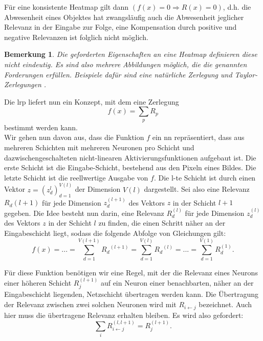 \documentclass[twoside, 12pt,a4paper]{book}
\newtheorem{remark}[theorem]{Bemerkung}
\numberwithin{equation}{section}
\begin{document}
	\noindent Für eine konsistente Heatmap gilt dann $(f(x) = 0 \Rightarrow R(x) = 0)$, d.h. die Abwesenheit eines Objektes hat zwangsläufig auch die Abwesenheit jeglicher Relevanz in der Eingabe zur Folge, eine Kompensation durch positive und negative Relevanzen ist folglich nicht möglich.
	
	\begin{remark}
		Die geforderten Eigenschaften an eine Heatmap definieren diese nicht eindeutig. Es sind also mehrere Abbildungen möglich, die die genannten Forderungen erfüllen. Beispiele dafür sind eine natürliche Zerlegung und Taylor-Zerlegungen \cite{dtd_paper}.
	\end{remark}
	
	\noindent Die \ac{lrp} liefert nun ein Konzept, mit dem eine Zerlegung 
	\begin{equation}
	f(x) = \sum_pR_p
	\end{equation}
	bestimmt werden kann.\\
	
	
	
	\noindent Wir gehen nun davon aus, dass die Funktion $f$ ein \ac{nn} repräsentiert, dass aus mehreren Schichten mit mehreren Neuronen pro Schicht und dazwischengeschalteten nicht-linearen Aktivierungsfunktionen aufgebaut ist.
	Die erste Schicht ist die Eingabe-Schicht, bestehend aus den Pixeln eines Bildes. Die letzte Schicht ist die reellwertige Ausgabe von $f$. Die l-te Schicht ist durch einen Vektor $z = (z_d^{l})_{d=1}^{V(l)}$ der Dimension $V(l)$ dargestellt. Sei also eine Relevanz $R_d{(l+1)}$ für jede Dimension $z_d^{(l+1)}$ des Vektors $z$ in der Schicht $l+1$ gegeben. Die Idee \cite{LRP_first_paper} besteht nun darin, eine Relevanz $R_d^{(l)}$ für jede Dimension $z_d^{(l)}$ des Vektors $z$ in der Schicht $l$ zu finden, die einen Schritt näher an der Eingabeschicht liegt, sodass die folgende Abfolge von Gleichungen gilt:
	\begin{equation}
	f(x) = ... = \sum_{d=1}^{V(l+1)}{R_d}^{(l+1)} = \sum_{d=1}^{V(l)}{R_d}^{(l)} = ... = \sum_{d=1}^{V(1)}{R_d^{(1)}}.\label{erhaltungseigenschaft}
	\end{equation}
	
	
	\noindent Für diese Funktion benötigen wir eine Regel, mit der die Relevanz eines Neurons einer höheren Schicht $R_j^{(l+1)}$ auf ein Neuron einer benachbarten, näher an der Eingabeschicht liegenden, Netzschicht übertragen werden kann.
	Die Übertragung der Relevanz zwischen zwei solchen Neuronen wird mit $R_{i\leftarrow j}$ bezeichnet. Auch hier muss die übertragene Relevanz erhalten bleiben. Es wird also gefordert:
	\begin{equation}
	\sum_i{R_{i\leftarrow j}^{(l,l+1)}} = R_j^{(l+1)}.
	\end{equation}
	
\end{document}
